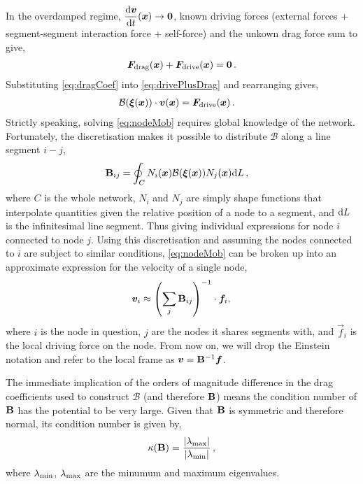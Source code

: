 In the overdamped regime, $\dfrac{\rvar{d}\vec{v}}{\rvar{d}t}(\vec{x}) \to \vec{0}$, known driving forces (external forces + segment-segment interaction force + self-force) and the unkown drag force sum to give,
\begin{align}\label{eq:drivePlusDrag}
    \vec{F}_\rvar{drag}(\vec{x}) + \vec{F}_\rvar{drive}(\vec{x}) = \vec{0}\,.
\end{align}
Substituting \cref{eq:dragCoef} into \cref{eq:drivePlusDrag} and rearranging gives,
\begin{align}\label{eq:nodeMob}
    \mathcal{B}(\vec{\xi}(\vec{x})) \cdot \vec{v}(\vec{x}) & = \vec{F}_\rvar{drive}(\vec{x})\,.
\end{align}
Strictly speaking, solving \cref{eq:nodeMob} requires global knowledge of the network. Fortunately, the discretisation makes it possible to distribute $\mathcal{B}$ along a line segment $i-j$,
\begin{align}\label{eq:dragMatrix}
    \mtx{B}_{ij} & = \oint_{C} N_i(\vec{x}) \mathcal{B}(\vec{\xi}(\vec{x})) N_j(\vec{x}) \rvar{d}L\,,
\end{align}
where $C$ is the whole network, $N_i$ and $N_j$ are simply shape functions that interpolate quantities given the relative position of a node to a segment, and $\textrm{d}L$ is the infinitesimal line segment. Thus giving individual expressions for node $i$ connected to node $j$. Using this discretisation and assuming the nodes connected to $i$ are subject to similar conditions, \cref{eq:nodeMob} can be broken up into an approximate expression for the velocity of a single node,
\begin{align}\label{eq:nodeVel}
    \vec{v}_i \approx \left(\sum\limits_j \mtx{B}_{ij}\right)^{-1} \cdot \vec{f}_i,\,
\end{align}
where $i$ is the node in question, $j$ are the nodes it shares segments with, and $\vec{f}_i$ is the local driving force on the node. From now on, we will drop the Einstein notation and refer to the local frame as $\vec{v} = \mtx{B}^{-1} \vec{f}$.

The immediate implication of the orders of magnitude difference in the drag coefficients used to construct $\mathcal{B}$ (and therefore $\mathbf{B}$) means the condition number of $\mathbf{B}$ has the potential to be very large. Given that $\mathbf{B}$ is symmetric and therefore normal, its condition number is given by,
\begin{align}\label{eq:conditionNumb}
    \kappa(\mathbf{B}) = \dfrac{\lvert \lambda_{\textrm{max}} \rvert}{\lvert \lambda_{\textrm{min}} \rvert} \,,
\end{align}
where $\lambda_{\textrm{min}}$, $\lambda_{\textrm{max}}$ are the minumum and maximum eigenvalues.

